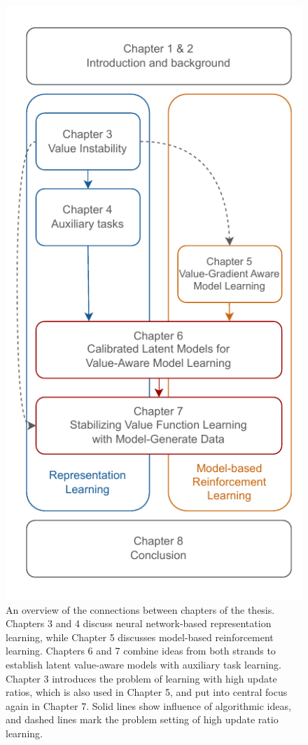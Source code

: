\begin{figure}
	\vspace{-2cm}
	\includegraphics[width=\linewidth]{illustrations/overview_thesis.drawio-1.pdf}
	\caption{An overview of the connections between chapters of the thesis. Chapters 3 and 4 discuss neural network-based representation learning, while Chapter 5 discusses model-based reinforcement learning. Chapters 6 and 7 combine ideas from both strands to establish latent value-aware models with auxiliary task learning. Chapter 3 introduces the problem of learning with high update ratios, which is also used in Chapter 5, and put into central focus again in Chapter 7. Solid lines show influence of algorithmic ideas, and dashed lines mark the problem setting of high update ratio learning.}
	\label{fig:structure_overview}
\end{figure}

